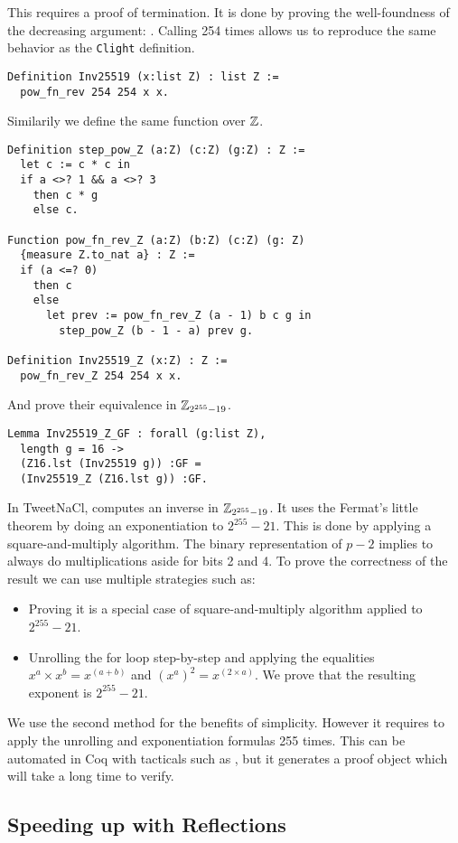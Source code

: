 This  requires a proof of termination. It is done by proving the
well-foundness of the decreasing argument: . Calling
 254 times allows us to reproduce the same behavior as the \texttt{Clight} definition.
\begin{lstlisting}[language=Coq]
Definition Inv25519 (x:list Z) : list Z :=
  pow_fn_rev 254 254 x x.
\end{lstlisting}
Similarily we define the same function over $\mathbb{Z}$.
\begin{lstlisting}[language=Coq]
Definition step_pow_Z (a:Z) (c:Z) (g:Z) : Z :=
  let c := c * c in
  if a <>? 1 && a <>? 3
    then c * g
    else c.

Function pow_fn_rev_Z (a:Z) (b:Z) (c:Z) (g: Z)
  {measure Z.to_nat a} : Z :=
  if (a <=? 0)
    then c
    else
      let prev := pow_fn_rev_Z (a - 1) b c g in
        step_pow_Z (b - 1 - a) prev g.

Definition Inv25519_Z (x:Z) : Z :=
  pow_fn_rev_Z 254 254 x x.
\end{lstlisting}
And prove their equivalence in $\mathbb{Z}_{2^{255}-19}$.
\begin{lstlisting}[language=Coq]
Lemma Inv25519_Z_GF : forall (g:list Z),
  length g = 16 ->
  (Z16.lst (Inv25519 g)) :GF =
  (Inv25519_Z (Z16.lst g)) :GF.
\end{lstlisting}
In TweetNaCl,  computes an inverse in $\mathbb{Z}_{2^{255}-19}$.
It uses the Fermat's little theorem by doing an exponentiation to $2^{255}-21$.
This is done by applying a square-and-multiply algorithm. The binary representation
of $p-2$ implies to always do multiplications aside for bits 2 and 4.
To prove the correctness of the result we can use multiple strategies such as:
\begin{itemize}
  \item Proving it is a special case of square-and-multiply algorithm applied to $2^{255}-21$.
  \item Unrolling the for loop step-by-step and applying the equalities
  $x^a \times x^b = x^{(a+b)}$ and $(x^a)^2 = x^{(2 \times a)}$. We prove that
  the resulting exponent is $2^{255}-21$.
\end{itemize}
We use the second method for the benefits of simplicity. However it requires to
apply the unrolling and exponentiation formulas 255 times. This can be automated
in Coq with tacticals such as , but it generates a proof object which
will take a long time to verify.

\subsection{Speeding up with Reflections}

